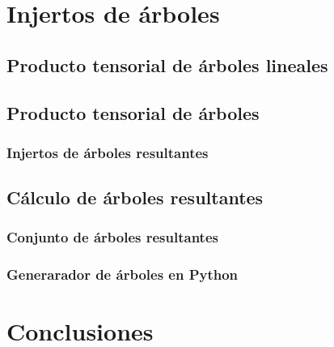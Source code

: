 \documentclass[11pt,a4paper,openright,oneside]{article}
\numberwithin{equation}{section}
\theoremstyle{definition}
\begin{document}

\section{Injertos de \'arboles}
\subsection{Producto tensorial de \'arboles lineales}
\subsection{Producto tensorial de \'arboles}
\subsubsection{Injertos de \'arboles resultantes}
\subsection{C\'alculo de \'arboles resultantes}
\subsubsection{Conjunto de \'arboles resultantes}
\subsubsection{Generarador de \'arboles en Python}
\newpage


\section{Conclusiones}
\newpage

\end{document}
